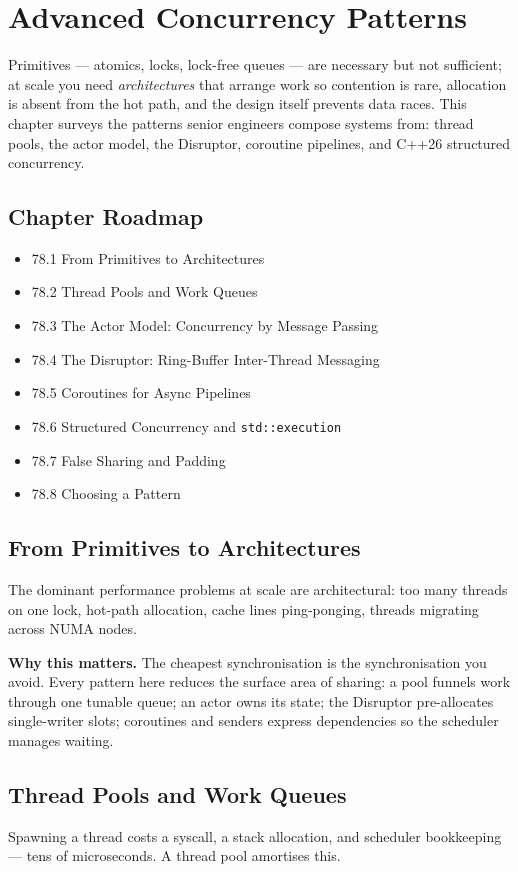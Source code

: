 \chapter{Advanced Concurrency Patterns}

Primitives --- atomics, locks, lock-free queues --- are necessary but not sufficient; at scale you need \emph{architectures} that arrange work so contention is rare, allocation is absent from the hot path, and the design itself prevents data races. This chapter surveys the patterns senior engineers compose systems from: thread pools, the actor model, the Disruptor, coroutine pipelines, and C++26 structured concurrency.

\section*{Chapter Roadmap}
\begin{itemize}
\item 78.1 From Primitives to Architectures
\item 78.2 Thread Pools and Work Queues
\item 78.3 The Actor Model: Concurrency by Message Passing
\item 78.4 The Disruptor: Ring-Buffer Inter-Thread Messaging
\item 78.5 Coroutines for Async Pipelines
\item 78.6 Structured Concurrency and \texttt{std::execution}
\item 78.7 False Sharing and Padding
\item 78.8 Choosing a Pattern
\end{itemize}

\section{From Primitives to Architectures}
The dominant performance problems at scale are architectural: too many threads on one lock, hot-path allocation, cache lines ping-ponging, threads migrating across NUMA nodes.

\textbf{Why this matters.} The cheapest synchronisation is the synchronisation you avoid. Every pattern here reduces the surface area of sharing: a pool funnels work through one tunable queue; an actor owns its state; the Disruptor pre-allocates single-writer slots; coroutines and senders express dependencies so the scheduler manages waiting.

\section{Thread Pools and Work Queues}
Spawning a thread costs a syscall, a stack allocation, and scheduler bookkeeping --- tens of microseconds. A thread pool amortises this.

